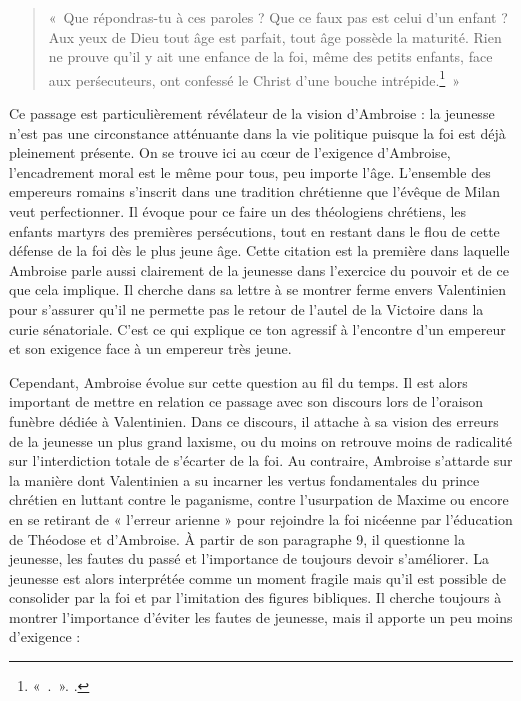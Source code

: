 \bigskip

\begin{quote}
«~Que répondras-tu à ces paroles ? Que ce faux pas est celui d'un enfant ? Aux yeux de Dieu tout âge est parfait, tout âge possède la maturité. Rien ne prouve qu'il y ait une enfance de la foi, même des petits enfants, face aux perśecuteurs, ont confessé le Christ d'une bouche intrépide.\footnote{«~.~». \cite[,15]{ambroise_lettres}.}~»
\end{quote}

\bigskip

Ce passage est particulièrement révélateur de la vision d’Ambroise : la jeunesse n’est pas une circonstance atténuante dans la vie politique puisque la foi est déjà pleinement présente. On se trouve ici au cœur de l'exigence d'Ambroise, l'encadrement moral est le même pour tous, peu importe l'âge. L'ensemble des empereurs romains s'inscrit dans une tradition chrétienne que l'évêque de Milan veut perfectionner. Il évoque pour ce faire un  des théologiens chrétiens, les enfants martyrs des premières persécutions, tout en restant dans le flou de cette défense de la foi dès le plus jeune âge. Cette citation est la première dans laquelle Ambroise parle aussi clairement de la jeunesse dans l'exercice du pouvoir et de ce que cela implique. Il cherche dans sa lettre à se montrer ferme envers Valentinien pour s'assurer qu'il ne permette pas le retour de l'autel de la Victoire dans la curie sénatoriale. C'est ce qui explique ce ton agressif à l'encontre d'un empereur et son exigence face à un empereur très jeune.

\bigskip

Cependant, Ambroise évolue sur cette question au fil du temps. Il est alors important de mettre en relation ce passage avec son discours lors de l'oraison funèbre dédiée à Valentinien. Dans ce discours, il attache à sa vision des erreurs de la jeunesse un plus grand laxisme, ou du moins on retrouve moins de radicalité sur l’interdiction totale de s'écarter de la foi. Au contraire, Ambroise s’attarde sur la manière dont Valentinien a su incarner les vertus fondamentales du prince chrétien en luttant contre le paganisme, contre l’usurpation de Maxime ou encore en se retirant de « l’erreur arienne » pour rejoindre la foi nicéenne par l’éducation de Théodose et d'Ambroise. À partir de son paragraphe 9, il questionne la jeunesse, les fautes du passé et l’importance de toujours devoir s’améliorer. La jeunesse est alors interprétée comme un moment fragile mais qu’il est possible de consolider par la foi et par l’imitation des figures bibliques. Il cherche toujours à montrer l'importance d'éviter les fautes de jeunesse, mais il apporte un peu moins d'exigence :

